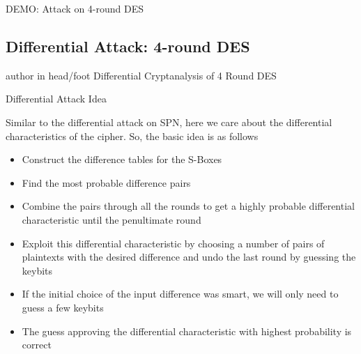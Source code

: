 \documentclass[9pt]{beamer}
\begin{document}
\begin{frame}
DEMO: Attack on 4-round DES
\end{frame}


\subsection{Differential Attack: 4-round DES}
\begin{frame}
\begin{beamercolorbox}[ht=2.5ex,dp=1.125ex,center,rounded=true,shadow=true]{author in head/foot}
Differential Cryptanalysis of 4 Round DES
\end{beamercolorbox}
\end{frame}

\begin{frame}
Differential Attack Idea

\vspace{5mm}
Similar to the differential attack on SPN, here we care about the differential characteristics of the cipher. \pause So, the basic idea is as follows

\begin{itemize}[<+->]
\item{Construct the difference tables for the S-Boxes}
\item{Find the most probable difference pairs}
\item{Combine the pairs through all the rounds to get a highly probable differential characteristic until the penultimate round}
\item{Exploit this differential characteristic by choosing a number of pairs of plaintexts with the desired difference and undo the last round by guessing the keybits}
\item{If the initial choice of the input difference was smart, we will only need to guess a few keybits}
\item{The guess approving the differential characteristic with highest probability is correct}
\end{itemize}

\end{frame}
\end{document}
